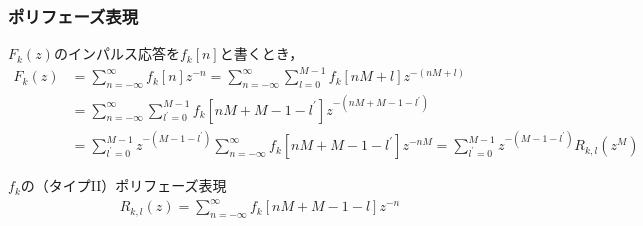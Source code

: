 \documentclass[14pt,xcolor=dvipsnames,table,dvipdfmx]{beamer}
\begin{document}
\begin{frame}[c]
    \frametitle{ポリフェーズ表現}
    $F_{k}(z)$のインパルス応答を$f_{k}[n]$と書くとき，
    \scriptsize
    \begin{align*}
        F_{k}(z) &= \sum_{n = -\infty}^{\infty} f_{k}[n] z^{-n} = \sum_{n = -\infty}^{\infty} \sum_{l = 0}^{M - 1} f_{k}[nM + l] z^{-(nM+l)} \\
        &= \sum_{n = -\infty}^{\infty} \sum_{l^{\prime} = 0}^{M - 1} f_{k}[nM + M - 1 - l^{\prime}] z^{-(nM + M - 1 - l^{\prime})} \\
        &= \sum_{l^{\prime} = 0}^{M - 1} z^{-(M - 1 - l^{\prime})} \sum_{n = -\infty}^{\infty} f_{k}[nM + M - 1 - l^{\prime}] z^{-nM} = \sum_{l^{\prime} = 0}^{M - 1} z^{-(M - 1 - l^{\prime})} R_{k,l}(z^{M})
    \end{align*}
    \normalsize
    \begin{block}{$f_{k}$の（タイプII）ポリフェーズ表現}
        \vspace{-13pt}
        \begin{align}
            R_{k,l}(z) = \sum_{n = -\infty}^{\infty} f_{k}[nM + M - 1 - l] z^{-n} \label{eq:type2_polyphase_representation}
        \end{align}
    \end{block}
\end{frame}
\end{document}
